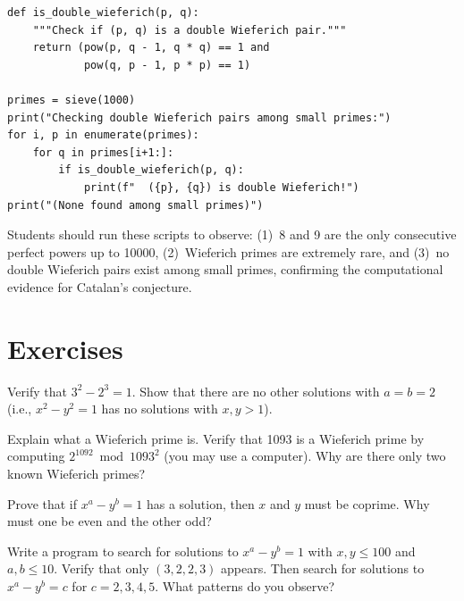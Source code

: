 \begin{verbatim}
def is_double_wieferich(p, q):
    """Check if (p, q) is a double Wieferich pair."""
    return (pow(p, q - 1, q * q) == 1 and
            pow(q, p - 1, p * p) == 1)

primes = sieve(1000)
print("Checking double Wieferich pairs among small primes:")
for i, p in enumerate(primes):
    for q in primes[i+1:]:
        if is_double_wieferich(p, q):
            print(f"  ({p}, {q}) is double Wieferich!")
print("(None found among small primes)")
\end{verbatim}

\begin{highlightbox}
Students should run these scripts to observe: (1)~8 and 9 are the only consecutive perfect powers up to 10000, (2)~Wieferich primes are extremely rare, and (3)~no double Wieferich pairs exist among small primes, confirming the computational evidence for Catalan's conjecture.
\end{highlightbox}

\section{Exercises}

\begin{exercise}[Basic]
Verify that $3^2 - 2^3 = 1$. Show that there are no other solutions with $a = b = 2$ (i.e., $x^2 - y^2 = 1$ has no solutions with $x, y > 1$).
\end{exercise}

\begin{exercise}[Intermediate]
Explain what a Wieferich prime is. Verify that 1093 is a Wieferich prime by computing $2^{1092} \bmod 1093^2$ (you may use a computer). Why are there only two known Wieferich primes?
\end{exercise}

\begin{exercise}[Challenge]
Prove that if $x^a - y^b = 1$ has a solution, then $x$ and $y$ must be coprime. Why must one be even and the other odd?
\end{exercise}

\begin{exercise}
Write a program to search for solutions to $x^a - y^b = 1$ with $x, y \leq 100$ and $a, b \leq 10$. Verify that only $(3, 2, 2, 3)$ appears. Then search for solutions to $x^a - y^b = c$ for $c = 2, 3, 4, 5$. What patterns do you observe?
\end{exercise}

